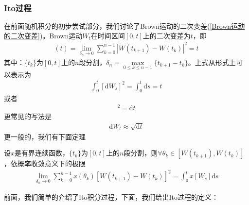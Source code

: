         \subsubsection{Ito过程}
            \label{subsubsec:Ito过程}
            \par
            在前面随机积分的初步尝试部分，我们讨论了Brown运动的二次变差(\ref{Brown运动的二次变差})。Brown运动$W_t$在时间区间$[0,t]$上的二次变差为$t$，即
            \begin{align*}
                [W,W](t) = \lim_{\delta_n \rightarrow 0} \sum_{k = 0}^{n - 1} |W(t_{k+1}) - W(t_k)|^2 = t
            \end{align*}
            其中：$\{t_k\}$为$[0,t]$上的$n$段分割，$\delta_n = \max\limits_{0 \leqslant k \leqslant n-1}\{t_{k+1} - t_k\}$。上式从形式上可以表示为
            \begin{align*}
                \int_0^t [\mathrm{d}W_s]^2 = \int_0^t \mathrm{d}s= t
            \end{align*}
            或者
            \begin{align*}
                [\mathrm{d}W_t]^2 = \mathrm{d}t
            \end{align*}
            更常见的写法是
            \begin{align}
                \label{Wt差分的计算公式}
                \mathrm{d}W_t \approx \sqrt{\mathrm{d}t}
            \end{align}
            更一般的，我们有下面定理
            \begin{theorem}
                设$x$是有界连续函数，$\{t_k\}$为$[0,t]$上的$n$段分割，则$\forall \theta_k \in [W(t_{k+1}),W(t_k)]$，依概率收敛意义下的极限
                \begin{align*}
                    \lim_{\delta_n \rightarrow 0} \sum_{k = 0}^{n - 1} x(\theta_k) [W(t_{k+1}) - W(t_k)]^2 = \int_0^t x[W_s]\mathrm{d}s
                \end{align*}
            \end{theorem}
            \par
            前面，我们简单的介绍了Ito积分过程，下面，我们给出Ito过程的定义：
